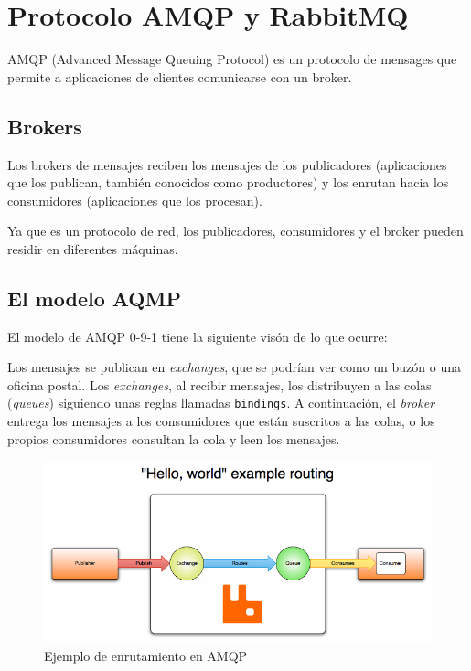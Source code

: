 \chapter{Protocolo AMQP y RabbitMQ}
\pagestyle{esitscCD}

AMQP (Advanced Message Queuing Protocol) es un protocolo de mensages que permite
a aplicaciones de clientes comunicarse con un broker.

\section{Brokers}

Los brokers de mensajes reciben los mensajes de los publicadores (aplicaciones
que los publican, también conocidos como productores) y los enrutan hacia los
consumidores (aplicaciones que los procesan).

Ya que es un protocolo de red, los publicadores, consumidores y el broker pueden
residir en diferentes máquinas.

\section{El modelo AQMP}

El modelo de AMQP 0-9-1 tiene la siguiente visón de lo que ocurre:

Los mensajes se publican en \emph{exchanges}, que se podrían ver como un buzón
o una oficina postal. Los \emph{exchanges}, al recibir mensajes, los distribuyen
a las colas (\emph{queues}) siguiendo unas reglas llamadas \texttt{bindings}.
A continuación, el \emph{broker} entrega los mensajes a los consumidores
que están suscritos a las colas, o los propios consumidores consultan la cola
y leen los mensajes.

\begin{figure}[htbp]
\centering
\includegraphics[width=\linewidth]{05-amqp/figuras/fig001}
\caption{Ejemplo de enrutamiento en AMQP}
\label{fig:figura1}
\end{figure}


